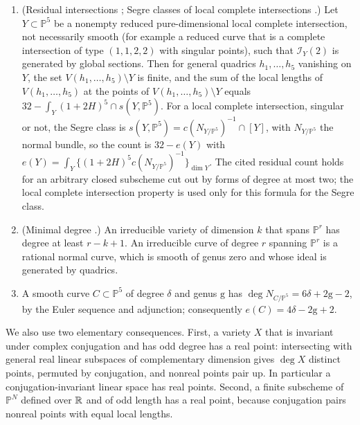\begin{enumerate}[label=(AG\arabic*)]
  series $(1+t)^N$, $\mathcal G_N$ is one-dimensional, and multiplication
  $\mathcal G_i\times\mathcal G_{N-i}\to\mathcal G_N$ is a perfect pairing. The
  same holds over $\Q$.
\item (Residual intersections
  \cite[Theorem~3.2 and Remark~3.3]{EklundJostPeterson2013}; Segre classes of
  local complete intersections \cite[Proposition~4.1]{Fulton1998}.) Let
  $Y\subset\mathbb P^5$ be a nonempty reduced pure-dimensional local complete
  intersection, not necessarily smooth (for example a reduced curve that is a
  complete intersection of type $(1,1,2,2)$ with singular points), such that
  $\mathcal I_Y(2)$ is generated by global sections. Then for general quadrics
  $h_1,\ldots,h_5$ vanishing on $Y$, the set $V(h_1,\ldots,h_5)\setminus Y$ is
  finite, and the sum of the local lengths of $V(h_1,\ldots,h_5)$ at the
  points of $V(h_1,\ldots,h_5)\setminus Y$ equals
  $32-\int_Y(1+2H)^5\cap s(Y,\mathbb P^5)$. For a local complete
  intersection, singular or not, the Segre class is $s(Y,\mathbb
  P^5)=c(N_{Y/\mathbb P^5})^{-1}\cap[Y]$, with $N_{Y/\mathbb P^5}$ the normal
  bundle, so the count is $32-e(Y)$ with
  $e(Y)=\int_Y\bigl\{(1+2H)^5c(N_{Y/\mathbb P^5})^{-1}\bigr\}_{\dim Y}$. The
  cited residual count holds for an arbitrary closed subscheme cut out by
  forms of degree at most two; the local complete intersection property is
  used only for this formula for the Segre class.
\item (Minimal degree \cite[Proposition~0, Theorem~1 and
  Lemma~2.1]{EisenbudHarris1987}.) An irreducible variety of dimension $k$ that
  spans $\mathbb P^r$ has degree at least $r-k+1$. An irreducible curve of
  degree $r$ spanning $\mathbb P^r$ is a rational normal curve, which is smooth
  of genus zero and whose ideal is generated by quadrics.
\item A smooth curve $C\subset\mathbb P^5$ of degree $\delta$ and genus
  $\mathrm g$ has $\deg N_{C/\mathbb P^5}=6\delta+2\mathrm g-2$, by the Euler
  sequence and adjunction; consequently $e(C)=4\delta-2\mathrm g+2$.
\end{enumerate}

We also use two elementary consequences. First, a variety $X$ that is
invariant under complex conjugation and has odd degree has a real point:
intersecting with general real linear subspaces of complementary dimension
gives $\deg X$ distinct points, permuted by conjugation, and nonreal points
pair up. In particular a conjugation-invariant linear space has real points.
Second, a finite subscheme of $\mathbb P^N$ defined over $\mathbb R$ and of odd length
has a real point, because conjugation pairs nonreal points with equal local
lengths.

